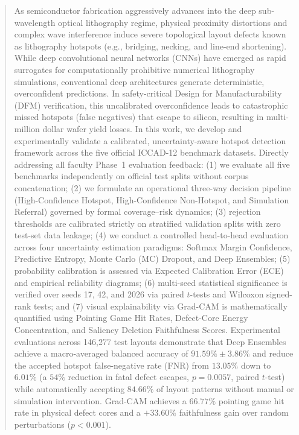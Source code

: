\documentclass[conference]{IEEEtran}
\begin{document}
\begin{abstract}
As semiconductor fabrication aggressively advances into the deep sub-wavelength optical lithography regime, physical proximity distortions and complex wave interference induce severe topological layout defects known as lithography hotspots (e.g., bridging, necking, and line-end shortening). While deep convolutional neural networks (CNNs) have emerged as rapid surrogates for computationally prohibitive numerical lithography simulations, conventional deep architectures generate deterministic, overconfident predictions. In safety-critical Design for Manufacturability (DFM) verification, this uncalibrated overconfidence leads to catastrophic missed hotspots (false negatives) that escape to silicon, resulting in multi-million dollar wafer yield losses.
In this work, we develop and experimentally validate a calibrated, uncertainty-aware hotspot detection framework across the five official ICCAD-12 benchmark datasets. Directly addressing all faculty Phase~1 evaluation feedback: (1) we evaluate all five benchmarks independently on official test splits without corpus concatenation; (2) we formulate an operational three-way decision pipeline (High-Confidence Hotspot, High-Confidence Non-Hotspot, and Simulation Referral) governed by formal coverage--risk dynamics; (3) rejection thresholds are calibrated strictly on stratified validation splits with zero test-set data leakage; (4) we conduct a controlled head-to-head evaluation across four uncertainty estimation paradigms: Softmax Margin Confidence, Predictive Entropy, Monte Carlo (MC) Dropout, and Deep Ensembles; (5) probability calibration is assessed via Expected Calibration Error (ECE) and empirical reliability diagrams; (6) multi-seed statistical significance is verified over seeds 17, 42, and 2026 via paired $t$-tests and Wilcoxon signed-rank tests; and (7) visual explainability via Grad-CAM is mathematically quantified using Pointing Game Hit Rates, Defect-Core Energy Concentration, and Saliency Deletion Faithfulness Scores.
Experimental evaluations across 146,277 test layouts demonstrate that Deep Ensembles achieve a macro-averaged balanced accuracy of $91.59\% \pm 3.86\%$ and reduce the accepted hotspot false-negative rate (FNR) from $13.05\%$ down to $6.01\%$ (a $54\%$ reduction in fatal defect escapes, $p = 0.0057$, paired $t$-test) while automatically accepting $84.66\%$ of layout patterns without manual or simulation intervention. Grad-CAM achieves a $66.77\%$ pointing game hit rate in physical defect cores and a $+33.60\%$ faithfulness gain over random perturbations ($p < 0.001$).
\end{abstract}
\end{document}
